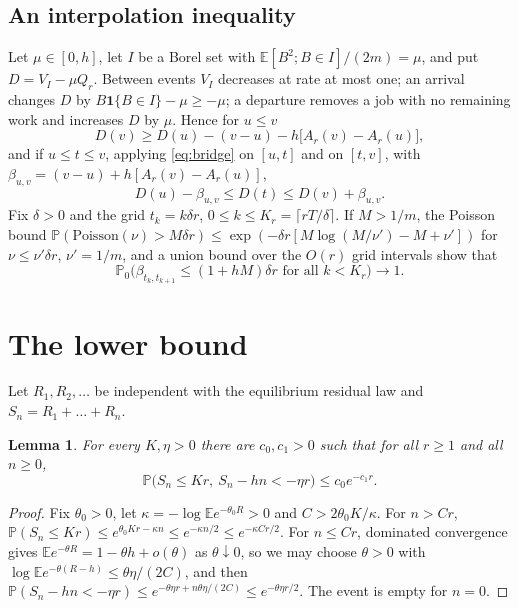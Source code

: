 \documentclass[11pt]{amsart}
\newtheorem{lemma}[theorem]{Lemma}
\theoremstyle{remark}
\numberwithin{equation}{section}
\newcommand{\E}{\mathbb E}
\newcommand{\Pp}{\mathbb P}
\newcommand{\1}{\mathbf 1}
\begin{document}
\subsection{An interpolation inequality}
Let $\mu\in[0,h]$, let $I$ be a Borel set with $\E[B^2;B\in I]/(2m)=\mu$, and put $D=V_I-\mu Q_r$. Between events $V_I$ decreases at rate at most one; an arrival changes $D$ by $B\1\{B\in I\}-\mu\ge-\mu$; a departure removes a job with no remaining work and increases $D$ by $\mu$. Hence for $u\le v$
\begin{equation}\label{eq:bridge}
D(v)\ge D(u)-(v-u)-h\bigl[A_r(v)-A_r(u)\bigr],
\end{equation}
and if $u\le t\le v$, applying \eqref{eq:bridge} on $[u,t]$ and on $[t,v]$, with $\beta_{u,v}=(v-u)+h[A_r(v)-A_r(u)]$,
\begin{equation}\label{eq:sandwich}
D(u)-\beta_{u,v}\le D(t)\le D(v)+\beta_{u,v}.
\end{equation}
Fix $\delta>0$ and the grid $t_k=k\delta r$, $0\le k\le K_r=\lceil rT/\delta\rceil$. If $M>1/m$, the Poisson bound $\Pp(\mathrm{Poisson}(\nu)>M\delta r)\le\exp(-\delta r[M\log(M/\nu')-M+\nu'])$ for $\nu\le\nu'\delta r$, $\nu'=1/m$, and a union bound over the $O(r)$ grid intervals show that
\begin{equation}\label{eq:budget}
\Pp_0\bigl(\beta_{t_k,t_{k+1}}\le(1+hM)\delta r\text{ for all }k<K_r\bigr)\to1 .
\end{equation}

\section{The lower bound}\label{sec:lower}

Let $R_1,R_2,\dots$ be independent with the equilibrium residual law and $S_n=R_1+\dots+R_n$.

\begin{lemma}\label{lem:lowertail}
For every $K,\eta>0$ there are $c_0,c_1>0$ such that for all $r\ge1$ and all $n\ge0$,
\[
\Pp\bigl(S_n\le Kr,\ S_n-hn<-\eta r\bigr)\le c_0e^{-c_1r}.
\]
\end{lemma}

\begin{proof}
Fix $\theta_0>0$, let $\kappa=-\log\E e^{-\theta_0R}>0$ and $C>2\theta_0K/\kappa$. For $n>Cr$, $\Pp(S_n\le Kr)\le e^{\theta_0Kr-\kappa n}\le e^{-\kappa n/2}\le e^{-\kappa Cr/2}$. For $n\le Cr$, dominated convergence gives $\E e^{-\theta R}=1-\theta h+o(\theta)$ as $\theta\downarrow0$, so we may choose $\theta>0$ with $\log\E e^{-\theta(R-h)}\le\theta\eta/(2C)$, and then $\Pp(S_n-hn<-\eta r)\le e^{-\theta\eta r+n\theta\eta/(2C)}\le e^{-\theta\eta r/2}$. The event is empty for $n=0$.
\end{proof}
\end{document}
